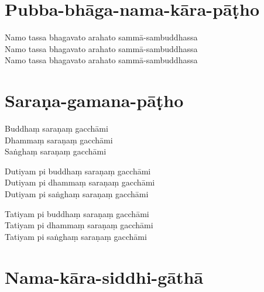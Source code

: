 \section{Pubba-bhāga-nama-kāra-pāṭho}

Namo tassa bhagavato arahato sammā-sambuddhassa\\
Namo tassa bhagavato arahato sammā-sambuddhassa\\
Namo tassa bhagavato arahato sammā-sambuddhassa

\section{Saraṇa-gamana-pāṭho}

\begin{paritta}
Buddhaṃ saraṇaṃ gacchāmi\\
Dhammaṃ saraṇaṃ gacchāmi\\
Saṅghaṃ saraṇaṃ gacchāmi

Dutiyam pi buddhaṃ saraṇaṃ gacchāmi\\
Dutiyam pi dhammaṃ saraṇaṃ gacchāmi\\
Dutiyam pi saṅghaṃ saraṇaṃ gacchāmi

Tatiyam pi buddhaṃ saraṇaṃ gacchāmi\\
Tatiyam pi dhammaṃ saraṇaṃ gacchāmi\\
Tatiyam pi saṅghaṃ saraṇaṃ gacchāmi
\end{paritta}

\enlargethispage{\baselineskip}

\section{Nama-kāra-siddhi-gāthā}

